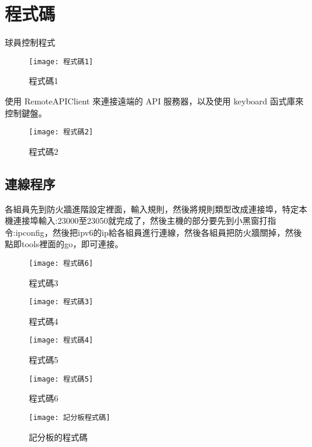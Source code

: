 \chapter{程式碼}
 球員控制程式\\
 
 \begin{figure}[hbt!]
\begin{center}
\texttt{[image: 程式碼1]}
\caption{\Large 程式碼1}\label{fig.程式碼1}
\end{center}
\end{figure}

 使用 RemoteAPIClient 來連接遠端的 API 服務器，以及使用
keyboard 函式庫來控制鍵盤。\\
\begin{figure}[hbt!]
\begin{center}
\texttt{[image: 程式碼2]}
\caption{\Large 程式碼2}\label{fig.程式碼2}
\end{center}
\end{figure}
\newpage
 
\section{連線程序}
各組員先到防火牆進階設定裡面，輸入規則，然後將規則類型改成連接埠，特定本機連接埠輸入:23000至23050就完成了，然後主機的部分要先到小黑窗打指令:ipconfig，然後把ipv6的ip給各組員進行連線，然後各組員把防火牆關掉，然後點即tools裡面的go，即可連接。\\
\begin{figure}[hbt!]
\begin{center}
\texttt{[image: 程式碼6]}
\caption{\Large 程式碼3}\label{fig.程式碼6}
\end{center}
\end{figure}

\begin{figure}[hbt!]
\begin{center}
\texttt{[image: 程式碼3]}
\caption{\Large 程式碼4}\label{fig.程式碼3}
\end{center}
\end{figure}
\newpage

\begin{figure}[hbt!]
\begin{center}
\texttt{[image: 程式碼4]}
\caption{\Large 程式碼5}\label{fig.程式碼4}
\end{center}
\end{figure}

\begin{figure}[hbt!]
\begin{center}
\texttt{[image: 程式碼5]}
\caption{\Large 程式碼6}\label{fig.程式碼5}
\end{center}
\end{figure}
\newpage

\begin{figure}[hbt!]
\begin{center}
\texttt{[image: 記分板程式碼]}
\caption{\Large 記分板的程式碼}\label{fig.記分板程式碼}
\end{center}
\end{figure}
\newpage